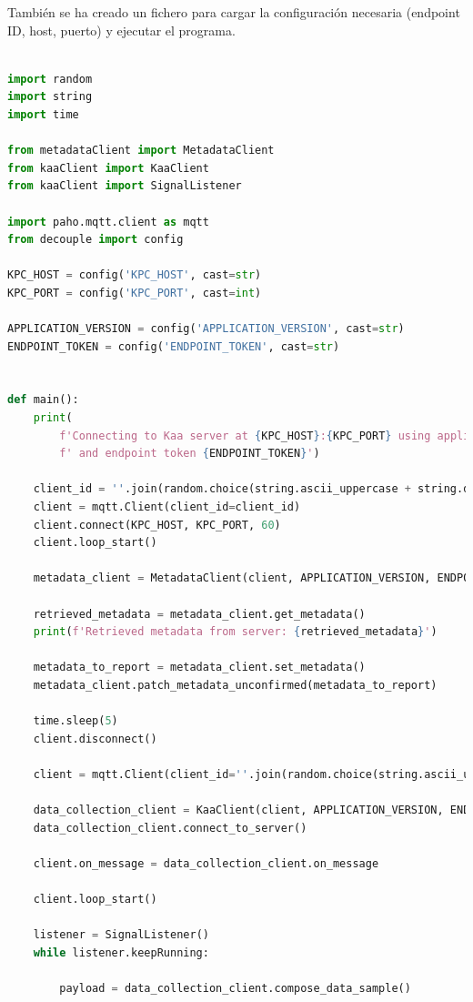 También se ha creado un fichero para cargar la configuración necesaria (endpoint ID, host, puerto) y ejecutar el programa.

\begin{lstlisting}[language=Python]

import random
import string
import time

from metadataClient import MetadataClient
from kaaClient import KaaClient
from kaaClient import SignalListener

import paho.mqtt.client as mqtt
from decouple import config

KPC_HOST = config('KPC_HOST', cast=str)
KPC_PORT = config('KPC_PORT', cast=int)

APPLICATION_VERSION = config('APPLICATION_VERSION', cast=str)
ENDPOINT_TOKEN = config('ENDPOINT_TOKEN', cast=str)


def main():
    print(
        f'Connecting to Kaa server at {KPC_HOST}:{KPC_PORT} using application version {APPLICATION_VERSION}'
        f' and endpoint token {ENDPOINT_TOKEN}')

    client_id = ''.join(random.choice(string.ascii_uppercase + string.digits) for _ in range(6))
    client = mqtt.Client(client_id=client_id)
    client.connect(KPC_HOST, KPC_PORT, 60)
    client.loop_start()

    metadata_client = MetadataClient(client, APPLICATION_VERSION, ENDPOINT_TOKEN)

    retrieved_metadata = metadata_client.get_metadata()
    print(f'Retrieved metadata from server: {retrieved_metadata}')

    metadata_to_report = metadata_client.set_metadata()
    metadata_client.patch_metadata_unconfirmed(metadata_to_report)

    time.sleep(5)
    client.disconnect()

    client = mqtt.Client(client_id=''.join(random.choice(string.ascii_uppercase + string.digits) for _ in range(6)))

    data_collection_client = KaaClient(client, APPLICATION_VERSION, ENDPOINT_TOKEN, KPC_HOST, KPC_PORT)
    data_collection_client.connect_to_server()

    client.on_message = data_collection_client.on_message

    client.loop_start()

    listener = SignalListener()
    while listener.keepRunning:

        payload = data_collection_client.compose_data_sample()


\end{lstlisting}
